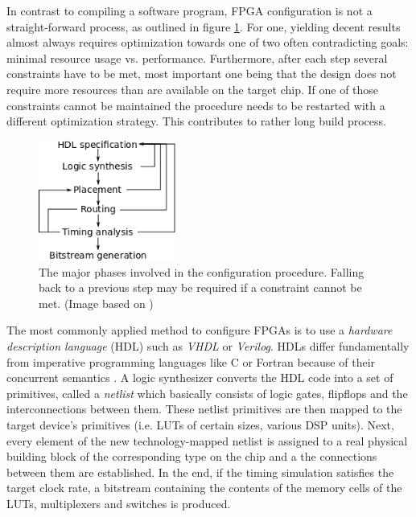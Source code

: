 In contrast to compiling a software program, FPGA configuration is not a straight-forward process, as outlined in figure \ref{fig:configflow}.
For one, yielding decent results almost always requires optimization towards one of two often contradicting goals: minimal resource usage vs. performance.
Furthermore, after each step several constraints have to be met, most important
one being that the design does not require more resources than are available on the target chip.
If one of those constraints cannot be maintained the procedure needs to be restarted with a different optimization strategy.
This contributes to rather long build process.


\begin{figure}[htb]
	  \centerline{
		\includegraphics[width=0.40\textwidth]{images/configflow.png}}
	  \caption{The major phases involved in the configuration procedure. Falling back to a previous step may be required if a constraint cannot be met. (Image based on \cite{hauck})}
	  \label{fig:configflow}
\end{figure}

The most commonly applied method to configure FPGAs is to use a \emph{hardware description language} (HDL) such as \emph{VHDL} or \emph{Verilog}.
HDLs differ fundamentally from imperative programming languages like C or Fortran because of their concurrent semantics \cite{hauck}.
A logic synthesizer converts the HDL code into a set of primitives, called a \emph{netlist} which basically consists of logic gates, flipflops and the interconnections between them.
These netlist primitives are then mapped to the target device's primitives (i.e. LUTs of certain sizes, various DSP units).
Next, every element of the new technology-mapped netlist is assigned to a real physical building block of the corresponding type on the chip and a the connections between them are established.
In the end, if the timing simulation satisfies the target clock rate, a bitstream containing the contents of the memory cells of the LUTs, multiplexers and switches is produced.

